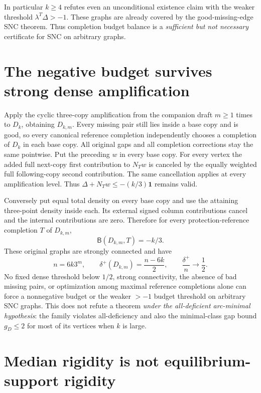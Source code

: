 In particular $k\ge4$ refutes even an unconditional existence claim
with the weaker threshold $\lambda^T\Delta>-1$. These graphs are
already covered by the good-missing-edge SNC theorem. Thus completion
budget balance is a \emph{sufficient but not necessary} certificate
for SNC on arbitrary graphs.

\section{The negative budget survives strong dense amplification}
\label{sec:weighted-transport-dense-obstruction}

Apply the cyclic three-copy amplification from the companion draft
$m\ge1$ times to $D_k$, obtaining $D_{k,m}$. Every missing pair
still lies inside a base copy and is good, so every canonical reference
completion independently chooses a completion of $D_k$ in each base
copy. All original gaps and all completion corrections stay the same
pointwise. Put the preceding $w$ in every base copy.
For every vertex the added full next-copy first contribution to
$N_Tw$ is canceled by the equally weighted full following-copy second
contribution. The same cancellation applies at every amplification
level. Thus $\Delta+N_Tw\le-(k/3)\mathbf1$ remains valid.

Conversely put equal total density on every base copy and use the
attaining three-point density inside each. Its external signed column
contributions cancel and the internal contributions are zero. Therefore
for every protection-reference completion $T$ of $D_{k,m}$,
\[
 \mathsf B(D_{k,m},T)=-k/3.
\]
These original graphs are strongly connected and have
\[
 n=6k3^m,\qquad \delta^+(D_{k,m})=\frac{n-6k}{2},\qquad
 \frac{\delta^+}{n}\longrightarrow\frac12.
\]
No fixed dense threshold below $1/2$, strong connectivity, the absence
of bad missing pairs, or optimization among maximal reference
completions alone can force a nonnegative budget or the weaker $>-1$
budget threshold on arbitrary SNC graphs. This does not refute a
theorem \emph{under the all-deficient arc-minimal hypothesis}: the
family violates all-deficiency and also the minimal-class gap bound
$g_D\le2$ for most of its vertices when $k$ is large.

\section{Median rigidity is not equilibrium-support rigidity}
\label{sec:weighted-transport-median-support-control}

